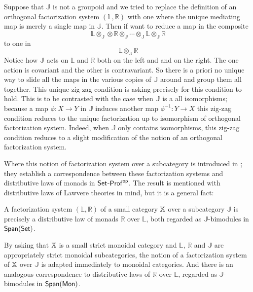 Suppose that  $\mathbb J $ is not a groupoid and we tried to replace the definition of an orthogonal factorization system $(\mathbb L, \mathbb R)$ with one where the unique mediating map is merely a single map in $\mathbb J$.
Then if want to reduce a map in the composite
$$\mathbb{L} \otimes_{\mathbb J} \otimes \mathbb{R} \otimes_{\mathbb J}  \cdots \otimes_{\mathbb J} \mathbb{L} \otimes_{\mathbb J} \mathbb R  $$
 to one in 
$$\mathbb{L} \otimes_{\mathbb J} \mathbb{R}$$
Notice how $\mathbb J$ acts on $\mathbb L$ and $\mathbb R$ both on the left and and on the right.  The one action is covariant and the other is contravariant.  So there is a priori no unique way to slide all the maps in the various copies of $\mathbb J$ around and group them all together.  This unique-zig-zag condition is asking precisely for this condition to hold.  This is to be contrasted with the case when $\mathbb J$ is a all isomorphisms; because a map $\phi:X\to Y$ in $\mathbb J$ induces another map $\phi^{-1}:Y\to X$ this zig-zag condition reduces to the unique factorization up to isomorphism of  orthogonal factorization system.  Indeed, when $\mathbb J$ only contains isomorphisms, this zig-zag condition reduces to a slight modification of the notion of an orthogonal factorization system.


Where this notion of factorization system over a subcategory is introduced in \cite{lawvere}; they establish a correspondence between these factorization systems and  distributive laws of monads in $\mathsf{Set}$-${\sf Prof}^{\mathsf{op}}$.   The result is mentioned with distributive laws of Lawvere theories in mind, but it is a general fact:
\begin{lemma}
\label{lem:zigzag}
A factorization system $(\mathbb{L},\mathbb{R})$ of a small  category $\mathbb{X}$ over a subcategory  $\mathbb J $ is precisely a distributive law of monads  $\mathbb{R}$ over $\mathbb{L}$, both regarded as $\mathbb{J}$-bimodules in $\mathsf{Span}(\mathsf{Set})$.
\end{lemma}
By asking that $\mathbb{X}$ is a small strict monoidal category and  $\mathbb{L}$, $\mathbb{R}$ and $\mathbb{J}$ are appropriately strict monoidal subcategories, the notion of a factorization system of $\mathbb{X}$ over $\mathbb J$ is adapted immediately to  monoidal categories. And there is an analogous correspondence  to distributive laws of $\mathbb{R}$ over $\mathbb{L}$, regarded as $\mathbb J$-bimodules in $\mathsf{Span}({\sf Mon})$.  




